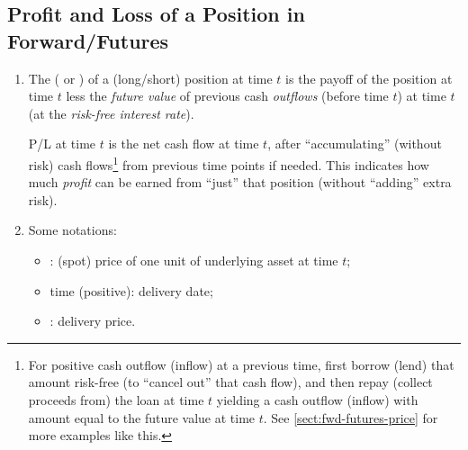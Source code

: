 \subsection{Profit and Loss of a Position in Forward/Futures}
\begin{enumerate}
\item The  ( or ) of a (long/short)
position at time \(t\) is the payoff of the position at time \(t\) less the
\emph{future value} of previous cash \emph{outflows} (before time \(t\)) at
time \(t\) (at the \emph{risk-free interest rate}).
\begin{center}
\end{center}

\begin{note}
P/L at time \(t\) is the net cash flow at time \(t\), after ``accumulating''
(without risk) cash flows\footnote{For positive cash outflow (inflow) at a
previous time, first borrow (lend) that amount risk-free (to ``cancel out''
that cash flow), and then repay (collect proceeds from) the loan at time \(t\)
 yielding a cash outflow (inflow) with amount equal to the
future value at time \(t\). See \cref{sect:fwd-futures-price} for more examples
like this.} from previous time points if needed. This indicates how much
\emph{profit} can be earned from ``just'' that position (without ``adding''
extra risk).
\end{note}

\item \label{it:fwd-futures-notations}
Some notations:
\begin{itemize}
\item {}: (spot) price of one unit of underlying asset
 at time \(t\);
\item time  (positive): delivery date;
\item {}: delivery price.
\end{itemize}



\end{enumerate}
